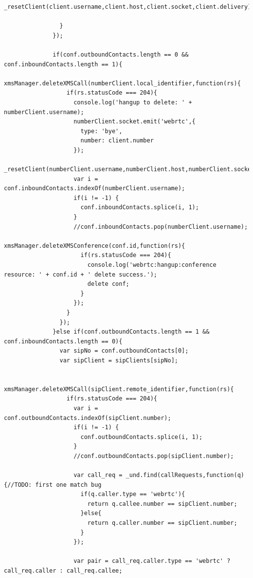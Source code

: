 \begin{appendices}
\begin{lstlisting}[caption={socket.js on Application Server},label={code:server_socket}]
                  _resetClient(client.username,client.host,client.socket,client.delivery);
                  
                }
              });

              if(conf.outboundContacts.length == 0 && conf.inboundContacts.length == 1){
                xmsManager.deleteXMSCall(numberClient.local_identifier,function(rs){
                  if(rs.statusCode === 204){
                    console.log('hangup to delete: ' + numberClient.username);
                    numberClient.socket.emit('webrtc',{ 
                      type: 'bye',
                      number: client.number
                    });
                    _resetClient(numberClient.username,numberClient.host,numberClient.socket,numberClient.delivery);
                    var i = conf.inboundContacts.indexOf(numberClient.username);
                    if(i != -1) {
                      conf.inboundContacts.splice(i, 1);
                    }
                    //conf.inboundContacts.pop(numberClient.username);
                    xmsManager.deleteXMSConference(conf.id,function(rs){
                      if(rs.statusCode === 204){
                        console.log('webrtc:hangup:conference resource: ' + conf.id + ' delete success.');
                        delete conf;
                      }
                    });
                  }
                });
              }else if(conf.outboundContacts.length == 1 && conf.inboundContacts.length == 0){
                var sipNo = conf.outboundContacts[0];
                var sipClient = sipClients[sipNo];

                xmsManager.deleteXMSCall(sipClient.remote_identifier,function(rs){
                  if(rs.statusCode === 204){
                    var i = conf.outboundContacts.indexOf(sipClient.number);
                    if(i != -1) {
                      conf.outboundContacts.splice(i, 1);
                    }
                    //conf.outboundContacts.pop(sipClient.number);

                    var call_req = _und.find(callRequests,function(q){//TODO: first one match bug
                      if(q.caller.type == 'webrtc'){
                        return q.callee.number == sipClient.number;
                      }else{
                        return q.caller.number == sipClient.number;
                      }
                    });

                    var pair = call_req.caller.type == 'webrtc' ? call_req.caller : call_req.callee;


\end{lstlisting}
\end{appendices}
